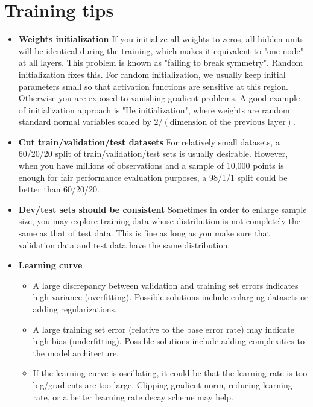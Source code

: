 \section{Training tips}
\label{sec1}
\begin{itemize}
    \item \textbf{Weights initialization} If you initialize all weights to zeros, all hidden units will be identical during the training, which makes it equivalent to "one node" at all layers. This problem is known as "failing to break symmetry". Random initialization fixes this. For random initialization, we usually keep initial parameters small so that activation functions are sensitive at this region. Otherwise you are exposed to vanishing gradient problems. A good example of initialization approach is "He initialization", where weights are random standard normal variables scaled by $2/(\text{dimension of the previous layer})$.  
    \item \textbf{Cut train/validation/test datasets} For relatively small datasets, a 60/20/20 split of train/validation/test sets is usually desirable. However, when you have millions of observations and a sample of 10,000 points is enough for fair performance evaluation purposes, a 98/1/1 split could be better than 60/20/20. 
    \item \textbf{Dev/test sets should be consistent} Sometimes in order to enlarge sample size, you may explore training data whose distribution is not completely the same as that of test data. This is fine as long as you make sure that validation data and test data have the same distribution.
    \item \textbf{Learning curve}
    \begin{itemize}
        \item A large discrepancy between validation and training set errors indicates high variance (overfitting). Possible solutions include enlarging datasets or adding regularizations. 
        \item A large training set error (relative to the base error rate) may indicate high bias (underfitting). Possible solutions include adding complexities to the model architecture.  
        \item If the learning curve is oscillating, it could be that the learning rate is too big/gradients are too large. Clipping gradient norm, reducing learning rate, or a better learning rate decay scheme may help. 
    \end{itemize}


\end{itemize}
